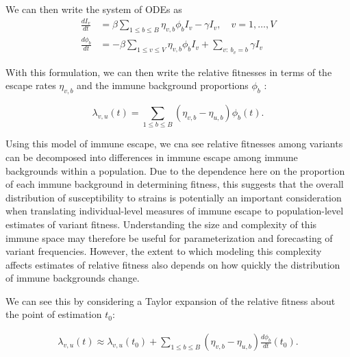 \documentclass[12pt,oneside,letterpaper]{article}
\begin{document}
We can then write the system of ODEs as 
\begin{align*}
    \frac{d I_{v}}{dt} &= \beta \sum_{1\leq b \leq B} \eta_{v, b} \phi_{b} I_{v} - \gamma I_{v}, \quad v = 1, \ldots, V\\
    \frac{d \phi_{b}}{dt} &= - \beta \sum_{1\leq v \leq V} \eta_{v,b}\phi_{b} I_{v} +  \sum_{v:\ b_{v} = b} \gamma I_{v}
\end{align*}

With this formulation, we can then write the relative fitnesses in terms of the escape rates $\eta_{v,b}$ and the immune background proportions $\phi_{b}$ :

\begin{equation} \label{eq:escape_relative_fitness}
    \lambda_{v, u}(t) = \sum_{1\leq b \leq B}(\eta_{v,b} - \eta_{u,b}) \phi_{b}(t).
\end{equation}

Using this model of immune escape, we cna see relative fitnesses among variants can be decomposed into differences in immune escape among immune backgrounds within a population.
Due to the dependence here on the proportion of each immune background in determining fitness, this suggests that the overall distribution of susceptibility to strains is potentially an important consideration when translating individual-level measures of immune escape to population-level estimates of variant fitness.
Understanding the size and complexity of this immune space may therefore be useful for parameterization and forecasting of variant frequencies.
However, the extent to which modeling this complexity affects estimates of relative fitness also depends on how quickly the distribution of immune backgrounds change.

We can see this by considering a Taylor expansion of the relative fitness about the point of estimation $t_{0}$:

\begin{align*}
    \lambda_{v,u}(t) \approx \lambda_{v,u}(t_{0}) + \sum_{1\leq b \leq B} (\eta_{v, b} - \eta_{u,b}) \frac{d\phi_b}{dt}(t_0).
\end{align*}



\end{document}
